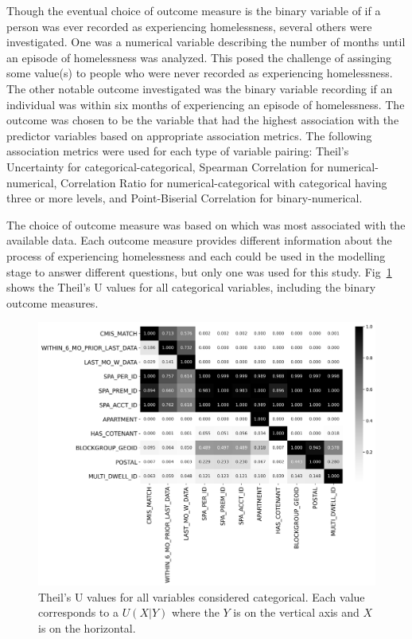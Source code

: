 \documentclass[10pt,letterpaper]{article}
\begin{document}
Though the eventual choice of outcome measure is the binary variable of if a person was ever recorded as experiencing homelessness, several others were investigated. One was a numerical variable describing the number of months until an episode of homelessness was analyzed. This posed the challenge of assinging some value(s) to people who were never recorded as experiencing homelessness. The other notable outcome investigated was the binary variable recording if an individual was within six months of experiencing an episode of homelessness. The outcome was chosen to be the variable that had the highest association with the predictor variables based on appropriate association metrics. The following association metrics were used for each type of variable pairing: Theil's Uncertainty for categorical-categorical, Spearman Correlation for numerical-numerical, Correlation Ratio for numerical-categorical with categorical having three or more levels, and Point-Biserial Correlation for binary-numerical.

The choice of outcome measure was based on which was most associated with the available data. Each outcome measure provides different information about the process of experiencing homelessness and each could be used in the modelling stage to answer different questions, but only one was used for this study. Fig~\ref{fig:cat_theil} shows the Theil's U values for all categorical variables, including the binary outcome measures.

\begin{figure}[htb]
    \centering
    \includegraphics[width=\textwidth]{../img/cat_theil.png}
    \caption[Categorical variable associations]{Theil's U values for all variables considered categorical. Each value corresponds to a $U(X|Y)$ where the $Y$ is on the vertical axis and $X$ is on the horizontal.}
    \label{fig:cat_theil}
\end{figure}
\end{document}
